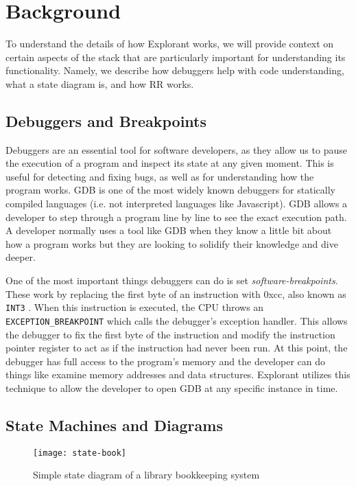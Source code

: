 \chapter{Background}
To understand the details of how Explorant works, we will provide context on certain aspects of the stack that are particularly important for understanding its functionality. Namely, we describe how debuggers help with code understanding, what a state diagram is, and how RR \cite{rr-site} works. 

\section{Debuggers and Breakpoints}
\label{sec:debuggers}
Debuggers are an essential tool for software developers, as they allow us to pause the execution of a program and inspect its state at any given moment. This is useful for detecting and fixing bugs, as well as for understanding how the program works. GDB \cite{gdb} is one of the most widely known debuggers for statically compiled languages (i.e. not interpreted languages like Javascript). GDB allows a developer to step through a program line by line to see the exact execution path. A developer normally uses a tool like GDB when they know a little bit about how a program works but they are looking to solidify their knowledge and dive deeper. 

One of the most important things debuggers can do is set \textit{software-breakpoints}. These work by replacing the first byte of an instruction with 0xcc, also known as \texttt{INT3} \cite{int3}. When this instruction is executed, the CPU throws an \texttt{EXCEPTION\_BREAKPOINT} which calls the debugger's exception handler. This allows the debugger to fix the first byte of the instruction and modify the instruction pointer register to act as if the instruction had never been run. At this point, the debugger has full access to the program's memory and the developer can do things like examine memory addresses and data structures. Explorant utilizes this technique to allow the developer to open GDB at any specific instance in time. 

\section{State Machines and Diagrams}
\label{sec:fsm}

\begin{figure}[!ht]
\centering
\texttt{[image: state-book]}
    \caption{Simple state diagram of a library bookkeeping system}
    \label{fig:state-book}
\end{figure}

